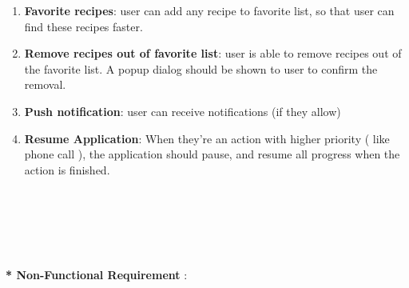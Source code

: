 \documentclass{article}
\begin{document}
\begin{enumerate}
        \item \textbf{Favorite recipes}: user can add any recipe to favorite list, so that user can find these recipes faster.
        \item \textbf{Remove recipes out of favorite list}: user is able to remove recipes out of the favorite list. A popup dialog should be shown to user to confirm the removal.
        \item \textbf{Push notification}: user can receive notifications (if they allow)
        \item \textbf{Resume Application}: When they're an action with higher priority ( like phone call ), the application should pause, and resume all progress when the action is finished.
    \end{enumerate}
\\ \\ \\ \\ \\
    \textbf{* Non-Functional Requirement} : 
\end{document}
